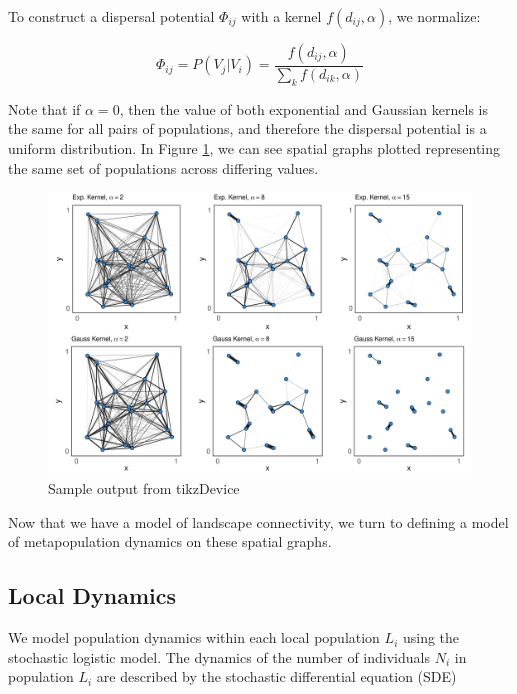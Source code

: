 \documentclass[]{article}
\begin{document}
To construct a dispersal potential $\Phi_{ij}$ with a kernel $f(d_{ij}, \alpha)$,  we normalize:

\[\Phi_{ij} = P(V_j|V_i)=\frac{f(d_{ij}, \alpha)}{\sum_k f(d_{ik},\alpha)}\]

Note that if \(\alpha=0\), then the value of both exponential and
Gaussian kernels is the same for all pairs of populations, and therefore
the dispersal potential is a uniform distribution. In Figure \ref{fig:mp},
we can see spatial graphs plotted representing the same set of
populations across differing values.


\begin{figure}
	    \centering
		\includegraphics[width=15cm]{./figs/figure1}
		\caption{Sample output from tikzDevice}	\label{fig:mp}
\end{figure}

Now that we have a model of landscape connectivity, we turn to defining a model of metapopulation dynamics on these spatial graphs.


\hypertarget{local-dynamics}{%
\subsection{Local Dynamics}\label{local-dynamics}}

We model population dynamics within each local population $L_i$ using
the stochastic logistic model. The dynamics of the number of individuals $N_i$
in population $L_i$  are described by the stochastic differential
equation (SDE)
\end{document}
